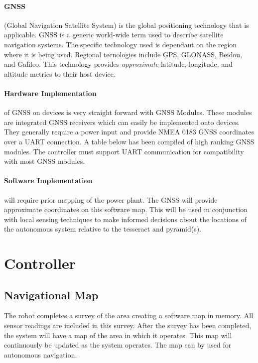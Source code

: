 \documentclass[12pt]{article}
\begin{document}
\paragraph{GNSS} (Global Navigation Satellite System) is the global positioning technology that is applicable. GNSS is a generic world-wide term used to describe satellite navigation systems. The specific technology used is dependant on the region where it is being used. Regional tecnologies include GPS, GLONASS, Beidou, and Galileo.  This technology provides \textit{approximate} latitude, longitude, and altitude metrics to their host device. 

\paragraph{Hardware Implementation} of GNSS on devices is very straight forward with GNSS Modules. These modules are integrated GNSS receivers which can easily be implemented onto devices. They generally require a power input and provide NMEA 0183 GNSS coordinates over a UART connection. A table below has been compiled of high ranking GNSS modules. The controller must support UART communication for compatibility with most GNSS modules.

\paragraph{Software Implementation} will require prior mapping of the power plant. The GNSS will provide approximate coordinates on this software map. This will be used in conjunction with local sensing techniques to make informed decisions about the locations of the autonomous system relative to the tesseract and pyramid(s).


\section{Controller}

\subsection{Navigational Map} The robot completes a survey of the area creating a software map in memory. All sensor readings are included in this survey. After the survey has been completed, the system will have a map of the area in which it operates. This map will continuously be updated as the system operates. The map can by used for autonomous navigation.
\end{document}
